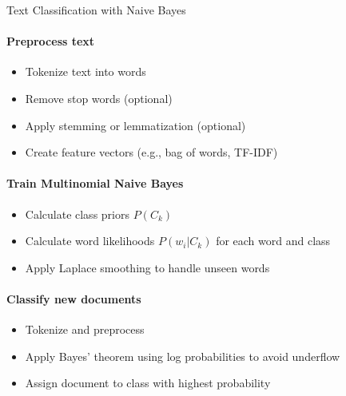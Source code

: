 \begin{KR}{Text Classification with Naive Bayes}
\paragraph{Preprocess text}
\begin{itemize}
    \item Tokenize text into words
    \item Remove stop words (optional)
    \item Apply stemming or lemmatization (optional)
    \item Create feature vectors (e.g., bag of words, TF-IDF)
\end{itemize}

\paragraph{Train Multinomial Naive Bayes}
\begin{itemize}
    \item Calculate class priors $P(C_k)$
    \item Calculate word likelihoods $P(w_i|C_k)$ for each word and class
    \item Apply Laplace smoothing to handle unseen words
\end{itemize}

\paragraph{Classify new documents}
\begin{itemize}
    \item Tokenize and preprocess
    \item Apply Bayes' theorem using log probabilities to avoid underflow
    \item Assign document to class with highest probability
\end{itemize}
\end{KR}


